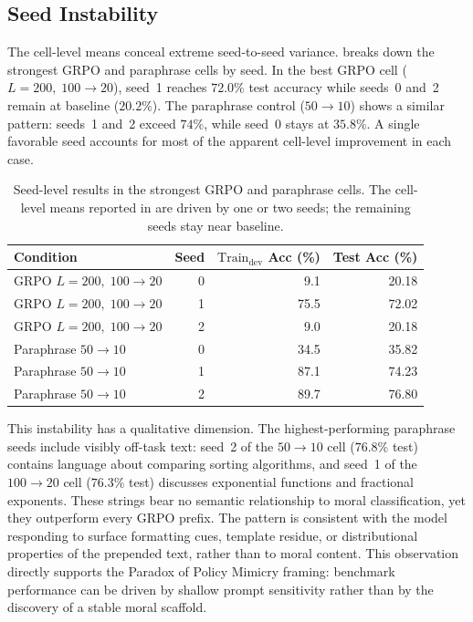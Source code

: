\documentclass[preprint]{article}
\newcommand{\Traindev}{\text{Train}_{\text{dev}}}
\begin{document}
\subsection{Seed Instability}
\label{sec:seed_instability}

The cell-level means conceal extreme seed-to-seed variance.
 breaks down the strongest GRPO and paraphrase cells by seed.
In the best GRPO cell ($L{=}200,\;100{\to}20$), seed~1 reaches $72.0\%$ test accuracy while seeds~0 and~2 remain at baseline ($20.2\%$).
The paraphrase control ($50{\to}10$) shows a similar pattern: seeds~1 and~2 exceed $74\%$, while seed~0 stays at $35.8\%$.
A single favorable seed accounts for most of the apparent cell-level improvement in each case.

\begin{table}[t]
\centering
\caption{Seed-level results in the strongest GRPO and paraphrase cells. The cell-level means reported in  are driven by one or two seeds; the remaining seeds stay near baseline.}
\label{tab:seed_instability_main}
\small
\begin{tabular}{lrrr}
\toprule
Condition & Seed & $\Traindev$ Acc (\%) & Test Acc (\%) \\
\midrule
GRPO $L{=}200,\;100{\to}20$ & 0 & 9.1 & 20.18 \\
GRPO $L{=}200,\;100{\to}20$ & 1 & 75.5 & 72.02 \\
GRPO $L{=}200,\;100{\to}20$ & 2 & 9.0 & 20.18 \\
\midrule
Paraphrase $50{\to}10$ & 0 & 34.5 & 35.82 \\
Paraphrase $50{\to}10$ & 1 & 87.1 & 74.23 \\
Paraphrase $50{\to}10$ & 2 & 89.7 & 76.80 \\
\bottomrule
\end{tabular}
\end{table}

This instability has a qualitative dimension.
The highest-performing paraphrase seeds include visibly off-task text: seed~2 of the $50{\to}10$ cell ($76.8\%$ test) contains language about comparing sorting algorithms, and seed~1 of the $100{\to}20$ cell ($76.3\%$ test) discusses exponential functions and fractional exponents.
These strings bear no semantic relationship to moral classification, yet they outperform every GRPO prefix.
The pattern is consistent with the model responding to surface formatting cues, template residue, or distributional properties of the prepended text, rather than to moral content.
This observation directly supports the Paradox of Policy Mimicry framing: benchmark performance can be driven by shallow prompt sensitivity rather than by the discovery of a stable moral scaffold.
\end{document}
